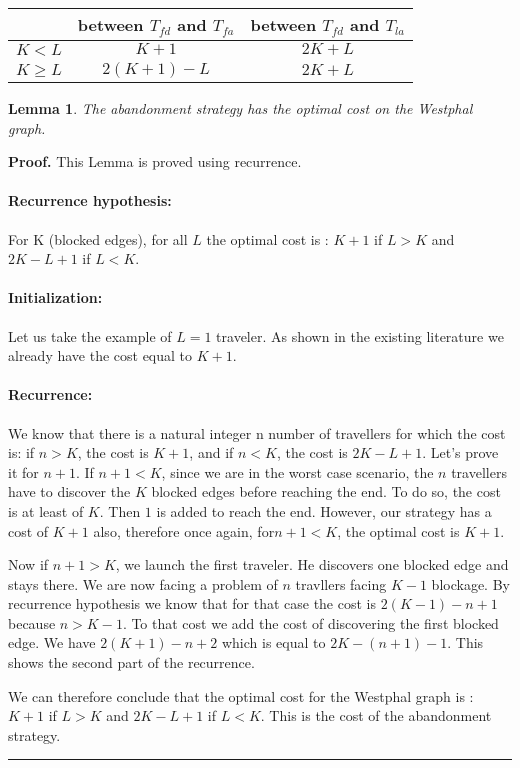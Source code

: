 \documentclass[letter-size, 11pt]{article}
\newtheorem{lemma}{Lemma}
\newenvironment{proof}[1][Proof]{\textbf{#1.} }{\ \rule{0.5em}{0.5em}}
\begin{document}
\begin{center}
\begin{tabular}{|c|c|c|}
\hline
 & between $T_{fd}$ and $T_{fa}$  & between $T_{fd}$ and $ T_{la}$ \\ 
\hline
 ${K<L}$  & ${K + 1}$ & ${ 2K + L}$   \\ 
\hline
 ${K \geq L}$  & ${2(K+1) - L}$ & ${2K + L}$   \\ 
\hline
\end{tabular}
\end{center}

\begin{lemma} The abandonment strategy has the optimal cost on the Westphal graph.
\end{lemma}

\begin{proof} This Lemma is proved using recurrence.  

\paragraph{Recurrence hypothesis:} For K (blocked edges), for all $L$ the optimal cost is : $K + 1$ if $L > K$ and $2K - L + 1$ if $L < K$.

\paragraph{Initialization:} Let us take the example of $L = 1$ traveler. As shown in the existing literature we already have the cost equal to $K + 1$.

\paragraph{Recurrence:} We know that there is a natural integer n number of travellers for which the cost is: if $n > K$, the cost is $K + 1$, and if $n < K$, the cost is $2K - L + 1$. Let's prove it for $n + 1$. 
If $n + 1 < K$, since we are in the worst case scenario, the $n$ travellers have to discover the $K$ blocked edges before reaching the end. To do so, the cost is at least of $K$. Then $1$ is added to reach the end. However, our strategy has a cost of $K + 1$ also, therefore once again, for$ n + 1 < K$, the optimal cost is $K + 1$. 

Now if $n + 1 > K$, we launch the first traveler. He discovers one blocked edge and stays there. We are now facing a problem of $n$ travllers facing $K-1$ blockage. By recurrence hypothesis we know that for that case the cost is $2(K-1) - n + 1$ because $n > K - 1$. To that cost we add the cost of discovering the first blocked edge. We have $2(K + 1) - n + 2$ which is equal to $2K - (n + 1) - 1$. This shows the second part of the recurrence.

We can therefore conclude that the optimal cost for the Westphal graph is : $K + 1$ if $L > K$ and $2K - L + 1$ if $L < K$. This is the cost of the abandonment strategy. 
\end{proof}
\end{document}
